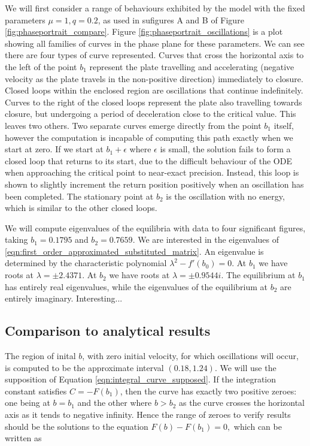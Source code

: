 \documentclass{article}
\begin{document}
We will first consider a range of behaviours exhibited by the model with the fixed parameters $\mu=1, q=0.2$,
as used in sufigures A and B of Figure \ref{fig:phaseportrait_compare}.
Figure \ref{fig:phaseportrait_oscillations} is a plot showing all families of curves in the phase plane for these parameters.
We can see there are four types of curve represented.
Curves that cross the horizontal axis to the left of the point $b_1$ represent the plate travelling and accelerating (negative velocity as the plate travels in the non-positive direction) immediately to closure.
Closed loops within the enclosed region are oscillations that continue indefinitely.
Curves to the right of the closed loops represent the plate also travelling towards closure,
but undergoing a period of deceleration close to the critical value.
This leaves two others. Two separate curves emerge directly from the point $b_1$ itself,
however the computation is incapable of computing this path exactly when we start at zero.
If we start at $b_1+\epsilon$ where $\epsilon$ is small,
the solution fails to form a closed loop that returns to its start,
due to the difficult behaviour of the ODE when approaching the critical point to near-exact precision.
Instead, this loop is shown to slightly increment the return position positively when an oscillation has been completed.
The stationary point at $b_2$ is the oscillation with no energy,
which is similar to the other closed loops.

We will compute eigenvalues of the equilibria with data to four significant figures, taking \(b_1 = 0.1795\) and \(b_2 = 0.7659\).
We are interested in the eigenvalues of \ref{eqn:first_order_approximated_substituted_matrix}.
An eigenvalue is determined by the characteristic polynomial \(\lambda^2 - f'(b_0) = 0\).
At \(b_1\) we have roots at \(\lambda = \pm 2.4371\).
At \(b_2\) we have roots at \(\lambda = \pm 0.9544 i\).
The equilibrium at $b_1$ has entirely real eigenvalues, while the eigenvalues of the equilibrium at $b_2$ are entirely imaginary.
Interesting...

\subsection{Comparison to analytical results}

The region of inital $b$, with zero initial velocity, for which oscillations will occur,
is computed to be the approximate interval $(0.18,1.24)$.
We will use the supposition of Equation \ref{eqn:integral_curve_supposed}.
If the integration constant satisfies $C = -F(b_1)$,
then the curve has exactly two positive zeroes:
one being at $b=b_1$ and the other where $b>b_2$ as the curve crosses the horizontal axis as it tends to negative infinity.
Hence the range of zeroes to verify results should be the solutions to the equation $F(b)-F(b_1)=0,$ which can be written as
\end{document}
